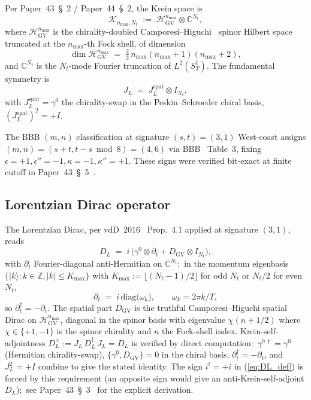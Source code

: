 \documentclass[11pt,a4paper]{article}
\theoremstyle{plain}
\theoremstyle{definition}
\newcommand{\nmax}{n_{\max}}
\newcommand{\Nt}{N_{t}}
\newcommand{\Kmax}{K_{\max}}
\newcommand{\SoneT}{S^{1}_{T}}
\newcommand{\Krein}{\mathcal{K}}
\newcommand{\C}{\mathbb{C}}
\newcommand{\Z}{\mathbb{Z}}
\newcommand{\DGV}{D_{\mathrm{GV}}}
\newcommand{\DL}{D_{L}}
\newcommand{\JL}{J_{L}}
\newcommand{\HGV}{\mathcal{H}_{\mathrm{GV}}}
\newcommand{\spat}{\mathrm{spat}}
\begin{document}
Per Paper~43~\cite{paper43}\S~2 / Paper~44~\cite{paper44}\S~2, the
Krein space is
\begin{equation}\label{eq:Krein_def}
   \Krein_{\nmax,\Nt} \;:=\; \HGV^{\nmax} \otimes \C^{\Nt},
\end{equation}
where $\HGV^{\nmax}$ is the chirality-doubled
Camporesi--Higuchi~\cite{camporesi_higuchi1996} spinor Hilbert space
truncated at the $\nmax$-th Fock shell, of dimension
\begin{equation}\label{eq:H_GV_dim}
   \dim\HGV^{\nmax} \;=\; \tfrac{2}{3}\,\nmax(\nmax+1)(\nmax+2),
\end{equation}
and $\C^{\Nt}$ is the $\Nt$-mode Fourier truncation of
$L^{2}(\SoneT)$. The fundamental symmetry is
\begin{equation}\label{eq:J_def}
   \JL \;=\; \JL^{\spat} \otimes I_{\Nt},
\end{equation}
with $\JL^{\spat} = \gamma^{0}$ the chirality-swap in the
Peskin--Schroeder chiral basis, $(\JL^{\spat})^{2} = +I$.

The BBB $(m, n)$ classification at signature $(s, t) = (3, 1)$
West-coast assigns $(m, n) = (s + t, t - s \bmod 8) = (4, 6)$ via
BBB~\cite{bizi_brouder_besnard2018} Table~3, fixing
$\epsilon = +1, \epsilon'' = -1, \kappa = -1, \kappa'' = +1$. These
signs were verified bit-exact at finite cutoff in
Paper~43~\S~5~\cite{paper43}.

\subsection{Lorentzian Dirac operator}\label{sec:lorentzian_dirac}

The Lorentzian Dirac, per vdD~2016~\cite{vandungen2016} Prop.~4.1
applied at signature $(3, 1)$, reads
\begin{equation}\label{eq:DL_def}
   \DL \;=\; i\,\bigl(\gamma^{0} \otimes \partial_{t}
                       + \DGV \otimes I_{\Nt}\bigr),
\end{equation}
with $\partial_{t}$ Fourier-diagonal anti-Hermitian on $\C^{\Nt}$:\
in the momentum eigenbasis $\{|k\rangle : k \in \Z, |k| \le \Kmax\}$
with $\Kmax := \lfloor(\Nt - 1)/2\rfloor$ for odd $\Nt$ or $\Nt/2$ for
even $\Nt$,
\begin{equation}\label{eq:partial_t_def}
   \partial_{t} \;=\; i\,\mathrm{diag}\bigl(\omega_{k}\bigr),
   \qquad \omega_{k} = 2\pi k / T,
\end{equation}
so $\partial_{t}^{\dagger} = -\partial_{t}$. The spatial part $\DGV$ is
the truthful Camporesi--Higuchi spatial Dirac on $\HGV^{\nmax}$,
diagonal in the spinor basis with eigenvalue $\chi(n + 1/2)$ where
$\chi \in \{+1, -1\}$ is the spinor chirality and $n$ the Fock-shell
index. Krein-self-adjointness $\DL^{\times} := \JL\,\DL^{\dagger}\,\JL
= \DL$ is verified by direct computation:\ $\gamma^{0\,\dagger} =
\gamma^{0}$ (Hermitian chirality-swap), $\{\gamma^{0}, \DGV\} = 0$ in
the chiral basis, $\partial_{t}^{\dagger} = -\partial_{t}$, and
$\JL^{2} = +I$ combine to give the stated identity. The sign $i^{t} =
+i$ in (\ref{eq:DL_def}) is forced by this requirement (an opposite
sign would give an anti-Krein-self-adjoint $\DL$);\ see
Paper~43~\S~3~\cite{paper43} for the explicit derivation.
\end{document}
